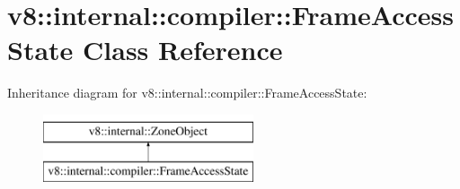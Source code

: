 \hypertarget{classv8_1_1internal_1_1compiler_1_1FrameAccessState}{}\section{v8\+:\+:internal\+:\+:compiler\+:\+:Frame\+Access\+State Class Reference}
\label{classv8_1_1internal_1_1compiler_1_1FrameAccessState}
Inheritance diagram for v8\+:\+:internal\+:\+:compiler\+:\+:Frame\+Access\+State\+:\begin{figure}[H]
\begin{center}
\leavevmode
\includegraphics[height=2.000000cm]{classv8_1_1internal_1_1compiler_1_1FrameAccessState}
\end{center}
\end{figure}
